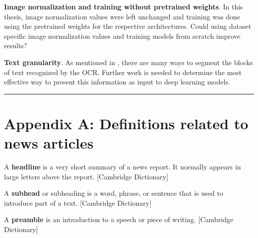 \documentclass[oneside, english, bibtex]{kththesis}
\begin{document}
\textbf{Image normalization and training without pretrained weights}. In this thesis, image normalization values were left unchanged and training was done using the pretrained weights for the respective architectures. Could using dataset specific image normalization values and training models from scratch improve results?

\textbf{Text granularity}. As mentioned in , there are many ways to segment the blocks of text recognized by the OCR. Further work is needed to determine the most effective way to present this information as input to deep learning models.


\noindent\rule{\textwidth}{0.4mm}

\cleardoublepage
\renewcommand{\bibname}{References}

\ifbiblatex
    \printbibliography[heading=bibintoc]
\else
    
\fi



\appendix
\renewcommand{\chaptermark}[1]{\markboth{Appendix \thechapter\relax:\thinspace\relax#1}{}}

\section{Appendix A: Definitions related to news articles}
\label{app:newsarticle}

\begin{definition}
\label{headline}
A \textbf{headline} is a very short summary of a news report. It normally appears in large letters above the report. [Cambridge Dictionary]
\end{definition}

\begin{definition}
\label{subhead}
A \textbf{subhead} or subheading is a word, phrase, or sentence that is used to introduce part of a text. [Cambridge Dictionary]
\end{definition}

\begin{definition}
\label{preamble}
A \textbf{preamble} is an introduction to a speech or piece of writing. [Cambridge Dictionary]
\end{definition}
\end{document}
